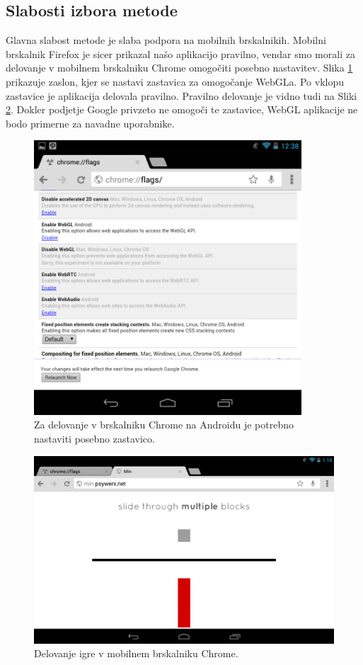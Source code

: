 \subsection{Slabosti izbora metode}

Glavna slabost metode je slaba podpora na mobilnih brskalnikih. Mobilni brskalnik Firefox je sicer prikazal našo aplikacijo pravilno, vendar smo morali za delovanje v mobilnem brskalniku Chrome omogočiti posebno nastavitev. Slika \ref{minchromeflag} prikazuje zaslon, kjer se nastavi zastavica za omogočanje WebGLa. Po vklopu zastavice je aplikacija delovala pravilno. Pravilno delovanje je vidno tudi na Sliki \ref{minchrome}. Dokler podjetje Google privzeto ne omogoči te zastavice, WebGL aplikacije ne bodo primerne za navadne uporabnike.

\begin{figure}
\begin{center}
\includegraphics[width=10cm]{pic/min-chrome-flag.png}
\end{center}
\caption{Za delovanje v brskalniku Chrome na Androidu je potrebno nastaviti posebno zastavico.}
\label{minchromeflag}
\end{figure} 

\begin{figure}
\begin{center}
\includegraphics[width=12cm]{pic/min-chrome.png}
\end{center}
\caption{Delovanje igre v mobilnem brskalniku Chrome.}
\label{minchrome}
\end{figure}

